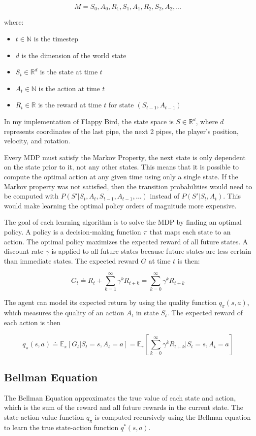 \documentclass{article}
\begin{document}
$$M = S_0,A_0,R_1,S_1,A_1,R_2,S_2,A_2, \ldots$$

where:
\begin{itemize}[leftmargin=*]  %
    \item $t \in \mathbb{N}$ is the timestep
    \item $d$ is the dimension of the world state
    \item $S_t \in \mathbb{R}^d$ is the state at time $t$
    \item $A_t \in \mathbb{N}$ is the action at time $t$
    \item $R_t \in \mathbb{R}$ is the reward at time $t$ for state $(S_{t-1},A_{t-1})$
\end{itemize}

In my implementation of Flappy Bird, the state space is $S \in \mathbb{R}^d$, where $d$ represents coordinates of the last pipe, the next 2 pipes, the player's position, velocity, and rotation.

Every MDP must satisfy the Markov Property, the next state is only dependent on the state prior to it, not any other states. This means that it is possible to compute the optimal action at any given time using only a single state. If the Markov property was not satisfied, then the transition probabilities would need to be computed with $P(S' | S_t,A_t,S_{t-1}, A_{t-1},...)$ instead of $P(S' | S_t,A_t)$. This would make learning the optimal policy orders of magnitude more expensive.

The goal of each learning algorithm is to solve the MDP by finding an optimal policy. A policy is a decision-making function $\pi$ that maps each state to an action. The optimal policy maximizes the expected reward of all future states. A discount rate $\gamma$ is applied to all future states because future states are less certain than immediate states. The expected reward $G$ at time $t$ is then:

$$G_t \doteq R_t + \sum^\infty_{k=1} \gamma^{k}R_{t+k} = \sum^\infty_{k=0}\gamma^kR_{t+k}$$

The agent can model its expected return by using the quality function $q_\pi(s,a)$, which measures the quality of an action $A_t$ in state $S_t$. The expected reward of each action is then

$$q_\pi(s,a) \doteq \mathbb{E}_\pi[G_t|S_t = s,A_t = a] = \mathbb{E}_\pi[\sum^\infty_{k=0}\gamma^kR_{t+k} | S_t = s,A_t = a]$$

\subsection{Bellman Equation}
The Bellman Equation approximates the true value of each state and action, which is the sum of the reward and all future rewards in the current state. The state-action value function $q_\pi$ is computed recursively using the Bellman equation to learn the true state-action function $q^*(s,a)$.
\end{document}
